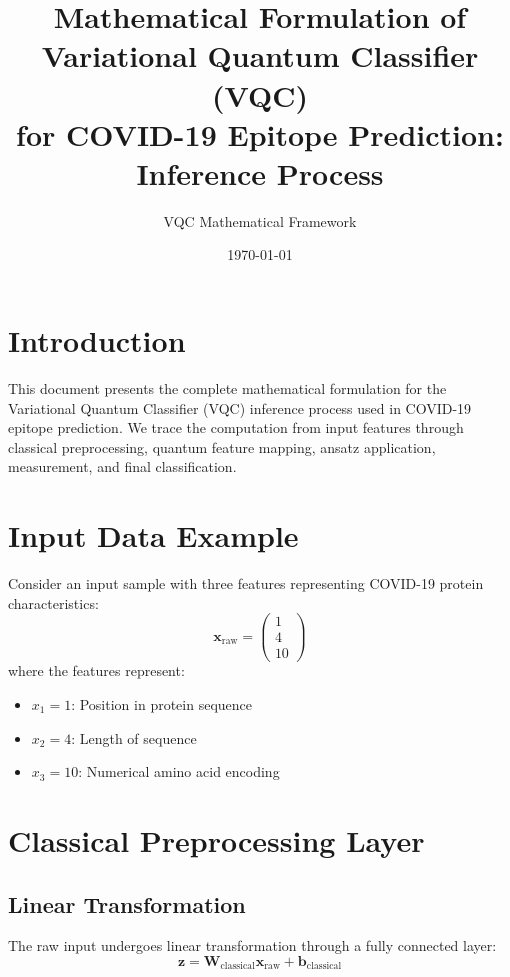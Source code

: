 \documentclass[12pt]{article}
\title{Mathematical Formulation of Variational Quantum Classifier (VQC) \\
for COVID-19 Epitope Prediction: Inference Process}
\author{VQC Mathematical Framework}
\date{\today}
\begin{document}
\maketitle

\section{Introduction}
This document presents the complete mathematical formulation for the Variational Quantum Classifier (VQC) inference process used in COVID-19 epitope prediction. We trace the computation from input features through classical preprocessing, quantum feature mapping, ansatz application, measurement, and final classification.

\section{Input Data Example}
Consider an input sample with three features representing COVID-19 protein characteristics:
\begin{equation}
\mathbf{x}_{\text{raw}} = \begin{pmatrix} 1 \\ 4 \\ 10 \end{pmatrix}
\end{equation}
where the features represent:
\begin{itemize}
    \item $x_1 = 1$: Position in protein sequence
    \item $x_2 = 4$: Length of sequence
    \item $x_3 = 10$: Numerical amino acid encoding
\end{itemize}

\section{Classical Preprocessing Layer}

\subsection{Linear Transformation}
The raw input undergoes linear transformation through a fully connected layer:
\begin{equation}
\mathbf{z} = \mathbf{W}_{\text{classical}} \mathbf{x}_{\text{raw}} + \mathbf{b}_{\text{classical}}
\end{equation}
\end{document}
